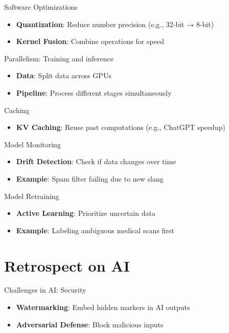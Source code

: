 \documentclass{beamer}
\begin{document}
\begin{frame}{Software Optimizations}
\begin{itemize}
\item \textbf{Quantization}: Reduce number precision (e.g., 32-bit → 8-bit)
\item \textbf{Kernel Fusion}: Combine operations for speed
\end{itemize}
\end{frame}

\begin{frame}{Parallelism: Training and inference}
\begin{itemize}
\item \textbf{Data}: Split data across GPUs
\item \textbf{Pipeline}: Process different stages simultaneously
\end{itemize}
\end{frame}

\begin{frame}{Caching}
\begin{itemize}
\item \textbf{KV Caching}: Reuse past computations (e.g., ChatGPT speedup)
\end{itemize}
\end{frame}

\begin{frame}{Model Monitoring}
\begin{itemize}
\item \textbf{Drift Detection}: Check if data changes over time
\item \textbf{Example}: Spam filter failing due to new slang
\end{itemize}
\end{frame}

\begin{frame}{Model Retraining}
\begin{itemize}
\item \textbf{Active Learning}: Prioritize uncertain data
\item \textbf{Example}: Labeling ambiguous medical scans first
\end{itemize}
\end{frame}

\section{Retrospect on AI}
\begin{frame}{Challenges in AI: Security}
\begin{itemize}
\item \textbf{Watermarking}: Embed hidden markers in AI outputs
\item \textbf{Adversarial Defense}: Block malicious inputs
\end{itemize}
\end{frame}
\end{document}
